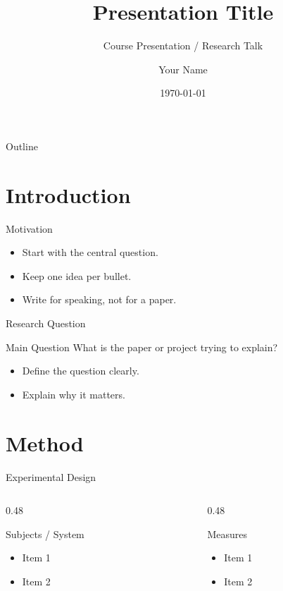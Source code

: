 \documentclass[aspectratio=169]{beamer}
\title{Presentation Title}
\subtitle{Course Presentation / Research Talk}
\author{Your Name}
\institute{Course / Department}
\date{\today}
\begin{document}
\frame{\titlepage}

\begin{frame}{Outline}
\tableofcontents
\end{frame}

\section{Introduction}

\begin{frame}{Motivation}
\begin{itemize}
  \item Start with the central question.
  \item Keep one idea per bullet.
  \item Write for speaking, not for a paper.
\end{itemize}
\end{frame}

\begin{frame}{Research Question}
\begin{block}{Main Question}
What is the paper or project trying to explain?
\end{block}

\begin{itemize}
  \item Define the question clearly.
  \item Explain why it matters.
\end{itemize}
\end{frame}

\section{Method}

\begin{frame}{Experimental Design}
\begin{columns}[T]
  \begin{column}{0.48\textwidth}
    \begin{block}{Subjects / System}
    \begin{itemize}
      \item Item 1
      \item Item 2
    \end{itemize}
    \end{block}
  \end{column}
  \begin{column}{0.48\textwidth}
    \begin{block}{Measures}
    \begin{itemize}
      \item Item 1
      \item Item 2
    \end{itemize}
    \end{block}
  \end{column}
\end{columns}
\end{frame}
\end{document}
